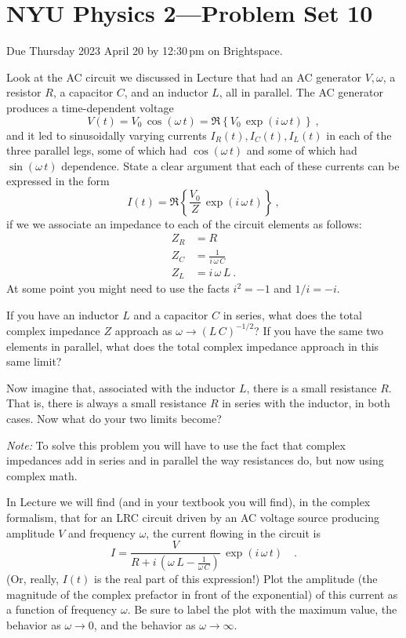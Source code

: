 \documentclass[12pt]{article}
\begin{document}
\section*{NYU Physics 2---Problem Set 10}

Due Thursday 2023 April 20 by 12:30\,pm on Brightspace.

\startproblem%
Look at the AC circuit we discussed in Lecture that had an AC generator $V,\omega$, a resistor $R$,
a capacitor $C$, and an inductor $L$, all in parallel.
The AC generator produces a time-dependent voltage
\begin{equation}
  V(t) = V_0\,\cos(\omega\,t) = \Re\left\{V_0\,\exp(i\,\omega\,t)\right\} ~,
\end{equation}
and it led to sinusoidally varying currents $I_R(t), I_C(t), I_L(t)$ in each of the three
parallel legs, some of which had $\cos(\omega\,t)$ and some of which had
$\sin(\omega\,t)$ dependence.
State a clear argument that each of these currents can be expressed in the
form
\begin{equation}
  I(t) = \Re\left\{\frac{V_0}{Z}\,\exp(i\,\omega\,t)\right\} ~,
\end{equation}
if we we associate an impedance to each of the circuit elements as follows:
\begin{align}
  Z_R &= R \\
  Z_C &= \frac{1}{i\,\omega\,C} \\
  Z_L &= i\,\omega\,L ~.
\end{align}
At some point you might need to use the facts $i^2 = -1$ and $1/i = -i$.

\startproblem%
If you have an inductor $L$ and a capacitor $C$ in series, what does
the total complex impedance $Z$ approach as $\omega\rightarrow
(L\,C)^{-1/2}$? If you have the same two elements in parallel, what
does the total complex impedance approach in this same limit?

Now imagine that, associated with the inductor $L$, there is a small
resistance $R$. That is, there is always a small resistance $R$ in
series with the inductor, in both cases. Now what do your two limits
become?

\textsl{Note:} To solve this problem you will have to use the fact that
complex impedances add in series and in parallel the way resistances do, but
now using complex math.

\startproblem%
In Lecture we will find (and in your textbook you will find), in the complex formalism, that for
an LRC circuit driven by an AC voltage source producing amplitude $V$ and frequency $\omega$, the current flowing in the
circuit is
\begin{equation}\label{eq:res}
  I = \frac{V}{R + i\,\left(\omega\,L - \frac{1}{\omega\,C}\right)}\,\exp(i\,\omega\,t)
  \quad .
\end{equation}
(Or, really, $I(t)$ is the real part of this expression!)
Plot the amplitude (the magnitude of the complex prefactor in front of
the exponential) of this current as a function of frequency
$\omega$. Be sure to label the plot with the maximum value, the behavior as
$\omega\rightarrow 0$, and the behavior as
$\omega\rightarrow\infty$.
\end{document}
